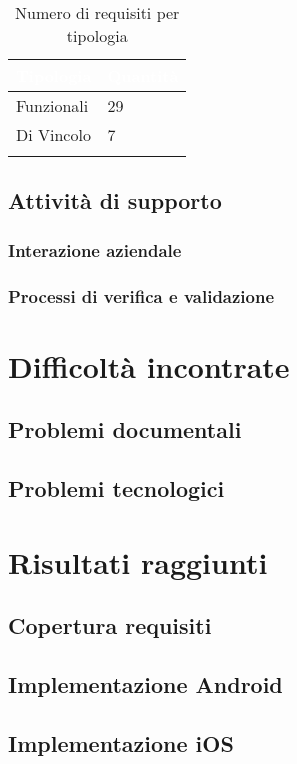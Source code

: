{
    \setlength{\freewidth}{\dimexpr\textwidth-10\tabcolsep}
    \renewcommand{\arraystretch}{1.5}
    \centering
    \setlength{\aboverulesep}{0pt}
    \setlength{\belowrulesep}{0pt}
    \begin{longtable}{C{.25\freewidth} C{.2\freewidth}} 
       \toprule
    \textcolor{white}{\textbf{Tipologia}}&
    \textcolor{white}{\textbf{Quantità}}\\
    \toprule
    \endhead

    Funzionali & 29\\
    Di Vincolo & 7\\
    \bottomrule
    \caption{Numero di requisiti per tipologia}
    \label{tab:requisiti-tipolgia}
    \end{longtable}
}

\subsection{Attività di supporto}
\subsubsection{Interazione aziendale}
\subsubsection{Processi di verifica e validazione}
\section{Difficoltà incontrate}
\subsection{Problemi documentali}
\subsection{Problemi tecnologici}


\section{Risultati raggiunti}
\subsection{Copertura requisiti}
\subsection{Implementazione Android}
\subsection{Implementazione iOS}
